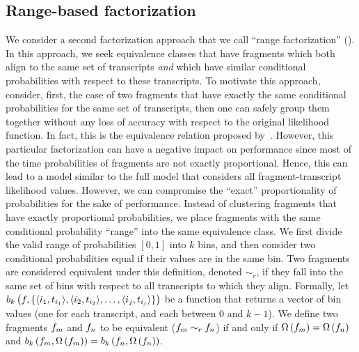 \subsection{Range-based factorization}
\label{subsec:range_fact}
We consider a second factorization approach that we call ``range factorization'' 
(\salmonrf).  In this approach, we seek equivalence classes that have fragments which 
both align to the same set of transcripts \emph{and} which have similar conditional 
probabilities with respect to these transcripts. To motivate this approach, consider, 
first, the case of two fragments that have exactly the same conditional probabilities 
for the same set of transcripts, then one can safely group them together without any 
loss of accuracy with respect to the original likelihood function. In fact, this is 
the equivalence relation proposed by~\citet{Nicolae2011Estimation}. However, this 
particular factorization can have a negative impact on performance since most of the 
time probabilities of fragments are not exactly proportional. Hence, this can lead to 
a model similar to the full model that considers all fragment-transcript likelihood 
values. However, we can compromise the ``exact'' proportionality of probabilities for 
the sake of performance. Instead of clustering fragments that have exactly proportional 
probabilities, we place fragments with the same conditional probability ``range'' into 
the same equivalence class. We first divide the valid range of probabilities 
$\left[0,1\right]$ into $k$ bins, and then consider two conditional probabilities equal 
if their values are in the same bin. Two fragments are considered equivalent under this 
definition, denoted $\sim_{r}$, if they fall into the same set of bins with respect to 
all transcripts to which they align.  Formally, let 
$b_k\left(f, \{ \langle i_1, t_{i_1} \rangle, \langle i_2, t_{i_2} \rangle, \dots, \langle i_j, t_{i_j} \rangle\}\right)$ be a 
function that returns a vector of bin values (one for each transcript, and each between 
$0$ and $k-1$).  We define two fragments $f_{m}$ and $f_{n}$ to be equivalent 
($f_{m} \sim_{r} f_{n}$) if and only if $\Omega\left(f_{m}\right) = \Omega\left(f_{n}\right)$ and 
$b_k\left(f_{m}, \Omega\left(f_{m}\right)\right) =  b_k\left(f_{n}, \Omega\left(f_{n}\right)\right)$.

